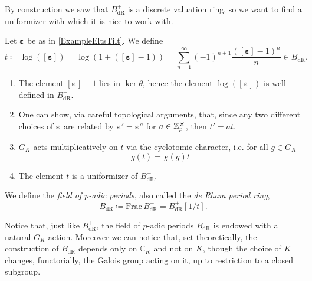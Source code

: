 \noindent
By construction we saw that $B_{\mathrm{dR}}^+$ is a discrete valuation ring,
so we want to find a uniformizer with which it is nice to work with.
\begin{defn}[]
	Let $\boldsymbol\varepsilon$ be as in \cref{ExampleEltsTilt}.
	We define
	\begin{equation*}
		t \coloneqq \log \left( [\boldsymbol\varepsilon] \right) =
		\log \left( 1 + ([\boldsymbol\varepsilon] - 1)\right) =
		\sum_{n = 1 }^{ \infty } (-1)^{n+1} 
		\frac{ ([\boldsymbol\varepsilon] - 1)^n }{ n }
		\in B_{\mathrm{dR}}^+
	.\end{equation*}
\end{defn}


\begin{rem}\leavevmode\vspace{-\baselineskip}
\begin{enumerate}
	\item The element $[\boldsymbol\varepsilon] - 1 $ lies in
		$\ker \theta$, hence the element $\log ([\boldsymbol\varepsilon])$
		is well defined in $B_{\mathrm{dR}}^+$.

	\item One can show, via careful topological arguments, that,
		since any two different choices of $\boldsymbol\varepsilon$
		are related by $\boldsymbol\varepsilon' = \boldsymbol\varepsilon^a$
		for $a \in \mathbb{Z}_{p}^{\cross}$, then
		$t' = a t$.

	\item $G_K$ acts multiplicatively on $t$ via the cyclotomic character,
		i.e. for all $g \in G_K$
		\begin{equation*}
		g(t) = \chi(g) t
		\end{equation*}

	\item The element $t$ is a uniformizer of $B_{\mathrm{dR}}^+$.
\end{enumerate}
\end{rem}


\begin{defn}
	We define the {\em field of $p$-adic periods}, also called
	the {\em de Rham period ring},
	\begin{equation*}
	B_{\mathrm{dR}} \coloneqq \mathrm{Frac}\, B_{\mathrm{dR}}^+ =
	B_{\mathrm{dR}}^+[1/t]
	.\end{equation*}
\end{defn}


\begin{rem}[]
	Notice that, just like $B_{\mathrm{dR}}^+$, the field of $p$-adic periods
	$B_{\mathrm{dR}}$ is endowed with a natural $G_K$-action.
	Moreover we can notice that, set theoretically, the construction of
	$B_{\mathrm{dR}}$ depends only on $\mathbb{C}_K$ and not on $K$,
	though the choice of $K$ changes, functorially, the Galois group acting on it,
	up to restriction to a closed subgroup.
\end{rem}


